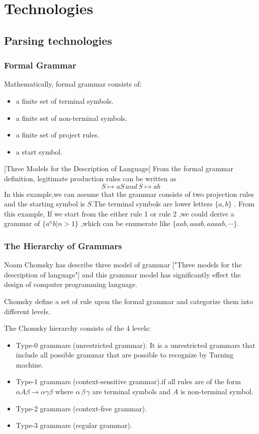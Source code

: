 \chapter{Technologies}
\section{Parsing technologies}
\subsection{Formal Grammar}

Mathematically, formal grammar consists of:
\begin{itemize}
\item a finite set of terminal symbols.
\item a finite set of non-terminal symbols.
\item a finite set of project rules.
\item a start symbol.
\end{itemize} \cite{aho1986compilers}
[Three Models for the Description of Language]
From the formal grammar definition, legitimate production rules can be written as 
 \[ S \mapsto aS  \,and \, S \mapsto ab \]
In this example,we can assume that the grammar consists of two projection rules and the starting symbol is $ S $.The terminal symbols are lower letters $ \{a ,b\} $ . From this example, If we start from the either rule 1 or rule 2 ,we could derive a  grammar of $ \{ a^n b | n>1  \}$ ,which can be enumerate like $ \{aab,aaab,aaaab,\cdots \} $.






\subsection{The Hierarchy of Grammars}
Noam Chomsky has describe three model of grammar ["Three models for the description of language"]  and this grammar model has significantly effect the design of computer programming language.


Chomsky define a set of rule upon the formal grammar and categorize them into different levels.

The Chomsky hierarchy consists of the 4 levels:
\begin{itemize}
\item Type-0 grammars (unrestricted grammar). It is a unrestricted grammars that include all possible grammar that are possible to recognize by Turning machine.
\item Type-1 grammars (context-sensitive grammar).if all rules are of the form $  \alpha A \beta \rightarrow \alpha \gamma \beta$ where $ \alpha \,  \beta \, \gamma $ are terminal symbols and $ A $ is non-terminal symbol.
\item Type-2 grammars (context-free grammar). 
\item Type-3 grammars (regular grammar).
\end{itemize}



